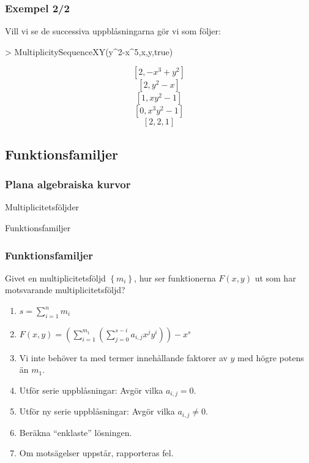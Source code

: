 \documentclass{beamer}
\begin{document}
\begin{frame}
	\frametitle{Exempel 2/2}
	\begin{example}
		Vill vi se de successiva uppblåsningarna gör vi som följer:
		
		\begin{semiverbatim}
			> MultiplicitySequenceXY(y\^{}2-x\^{}5,x,y,true)
		\end{semiverbatim}
		\[[2,-x^3+y^2]\]
		\[[2,y^2-x]\]
		\[[1,xy^2-1]\]
		\[[0,x^3y^2-1]\]
		\[\left[2, 2, 1\right]\]
	\end{example}
\end{frame}



\subsection{Funktionsfamiljer}

\begin{frame}
	\frametitle{Plana algebraiska kurvor}
	\begin{center}
		\Large Multiplicitetsföljder
		
		Funktionsfamiljer
	\end{center}
\end{frame}

\begin{frame}
	\frametitle{Funktionsfamiljer}
	Givet en multiplicitetsföljd $\left\{m_i\right\}$, hur ser funktionerna $F(x,y)$ ut som har motsvarande multiplicitetsföljd?
	
	
	\begin{enumerate}
		\item<3-> $s=\sum_{i=1}^{n} m_i$
		\item<4-> $F(x,y)=\left(\sum_{i=1}^{m_1}\left(\sum_{j=0}^{s-i} a_{i,j} x^j y^i\right)\right)-x^s$
		\item<5-> Vi inte behöver ta med termer innehållande faktorer av $y$ med högre potens än $m_1$.
		\item<6-> Utför serie uppblåsningar: Avgör vilka $a_{i,j}=0$.
		\item<7-> Utför ny serie uppblåsningar: Avgör vilka $a_{i,j} \neq 0$.
		\item<8-> Beräkna ``enklaste'' lösningen.
		\item<9-> Om motsägelser uppstår, rapporteras fel.
	\end{enumerate}
\end{frame}
\end{document}

